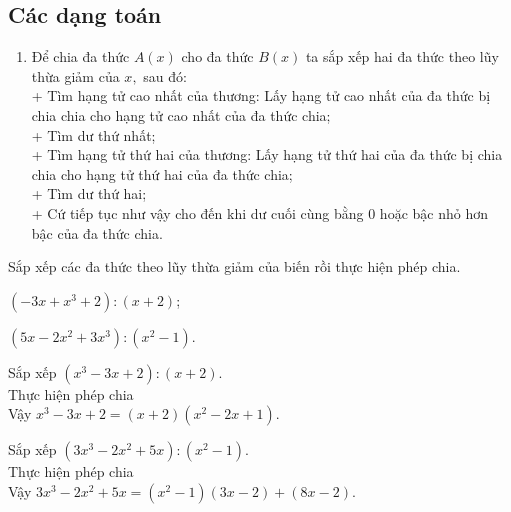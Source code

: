 \subsection{Các dạng toán}
\begin{dang}
	\begin{enumerate}[\tickEX]
		\item Để chia đa thức $A(x)$ cho đa thức  $B(x)$ ta sắp xếp hai đa thức theo lũy thừa giảm của $x,$ sau đó:\\
		+ Tìm hạng tử cao nhất của thương: Lấy hạng tử cao nhất của đa thức bị chia chia cho hạng tử cao nhất của đa thức chia;\\
		+ Tìm dư thứ nhất;\\
		+ Tìm hạng tử thứ hai của thương:  Lấy hạng tử thứ hai của đa thức bị chia chia cho hạng tử thứ hai của đa thức chia;\\
		+ Tìm dư thứ hai;\\
		+ Cứ tiếp tục như vậy cho đến khi dư cuối cùng bằng $0$ hoặc bậc nhỏ hơn bậc của đa thức chia.
	\end{enumerate}
\end{dang}
\begin{vd} %
	Sắp xếp các đa thức theo lũy thừa giảm của biến rồi thực hiện phép chia.
	\begin{listEX}
		\item $(-3x+x^3+2): (x+2)$;
		\item $(5x-2x^2+3x^3):(x^2-1)$.
	\end{listEX}
	\loigiai
	{
		\begin{listEX}
		\item  Sắp xếp $(x^3-3x+2):(x+2).$\\
		Thực hiện phép chia \\
		Vậy $x^3-3x+2=(x+2)(x^2-2x+1).$
		\item Sắp xếp $(3x^3-2x^2+5x):(x^2-1).$\\
		Thực hiện phép chia \\
		Vậy $3x^3-2x^2+5x=(x^2-1)(3x-2)+(8x-2).$
	\end{listEX}
	}
\end{vd}
